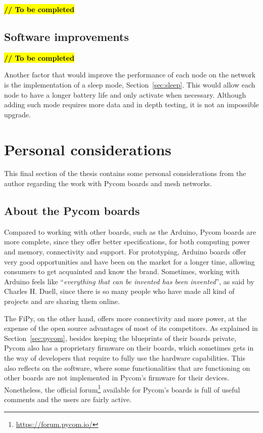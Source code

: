 			\textbf{\textcolor{red}{\hl{// To be completed}}}

		\subsection{Software improvements}\label{sec:software_improvements}
		
			\textbf{\textcolor{red}{\hl{// To be completed}}}
		
%			

			Another factor that would improve the performance of each node on the network is the implementation of a sleep mode, Section~\ref{sec:sleep}.
			This would allow each node to have a longer battery life and only activate when necessary.
			Although adding such mode requires more data and in depth testing, it is not an impossible upgrade.

	\section{Personal considerations}
	
		This final section of the thesis contains some personal considerations from the author regarding the work with Pycom boards and mesh networks.
	
		\subsection{About the Pycom boards}\label{sec:working_with_pycom}
		
			Compared to working with other boards, such as the Arduino, Pycom boards are more complete, since they offer better specifications, for both computing power and memory, connectivity and support.			
			For prototyping, Arduino boards offer very good opportunities and have been on the market for a longer time, allowing consumers to get acquainted and know the brand.
			Sometimes, working with Arduino feels like ``\textit{everything that can be invented has been invented}'', as said by Charles H. Duell, since there is so many people who have made all kind of projects and are sharing them online.
			
			The FiPy, on the other hand, offers more connectivity and more power, at the expense of the open source advantages of most of its competitors.
			As explained in Section~\ref{sec:pycom}, besides keeping the blueprints of their boards private, Pycom also has a proprietary firmware on their boards, which sometimes gets in the way of developers that require to fully use the hardware capabilities.
			This also reflects on the software, where some functionalities that are functioning on other boards are not implemented in Pycom's firmware for their devices.
			Nonetheless, the official forum\footnote{ \url{https://forum.pycom.io/}} available for Pycom's boards is full of useful comments and the users are fairly active.
			
